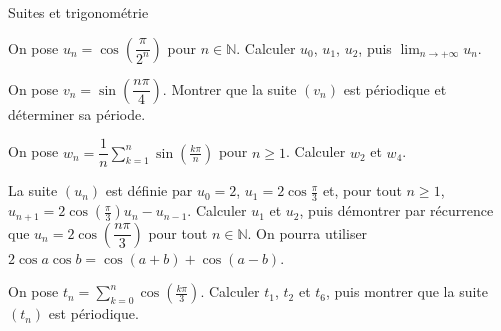 \begin{exercice}[3]{Suites et trigonométrie}
\begin{questions}
  \item On pose $u_n=\cos\left(\dfrac{\pi}{2^{n}}\right)$ pour $n\in\mathbb{N}$. Calculer $u_0$, $u_1$, $u_2$, puis $\displaystyle\lim_{n\to+\infty}u_n$.
  \item On pose $v_n=\sin\left(\dfrac{n\pi}{4}\right)$. Montrer que la suite $(v_n)$ est périodique et déterminer sa période.
  \item On pose $w_n=\dfrac1n\displaystyle\sum_{k=1}^{n}\sin\left(\frac{k\pi}{n}\right)$ pour $n\geq1$. Calculer $w_2$ et $w_4$.
  \item La suite $(u_n)$ est définie par $u_0=2$, $u_1=2\cos\frac{\pi}{3}$ et, pour tout $n\geq1$,
    $u_{n+1}=2\cos\left(\frac{\pi}{3}\right)u_n-u_{n-1}$. Calculer $u_1$ et $u_2$, puis démontrer par récurrence que
    $u_n=2\cos\left(\dfrac{n\pi}{3}\right)$ pour tout $n\in\mathbb{N}$. On pourra utiliser
    $2\cos a\cos b=\cos(a+b)+\cos(a-b)$.
  \item On pose $t_n=\displaystyle\sum_{k=0}^{n}\cos\left(\frac{k\pi}{3}\right)$. Calculer $t_1$, $t_2$ et $t_6$, puis montrer
    que la suite $(t_n)$ est périodique.
\end{questions}
\end{exercice}

